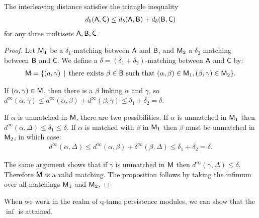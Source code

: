 \begin{proposition}
The interleaving distance satisfies the triangle inequality
\begin{align*}
d_b(\mathsf{A}, \mathsf{C}) \leq d_b(\mathsf{A}, \mathsf{B}) + d_b(\mathsf{B}, \mathsf{C})
\end{align*}
for any three multisets $\mathsf{A}, \mathsf{B}, \mathsf{C}$.
\end{proposition}
\begin{proof}
Let $\mathsf{M}_1$ be a $\delta_1$-matching between $\mathsf{A}$ and $\mathsf{B}$, and $\mathsf{M}_2$ a $\delta_2$ matching between $\mathsf{B}$ and $\mathsf{C}$. We define a $\delta = (\delta_1 + \delta_2)$-matching between $\mathsf{A}$ and $\mathsf{C}$ by:
\begin{align*}
\mathsf{M} = \{ (a, \gamma) \, \mid \, \text{there exists } \beta \in \mathsf{B} \text{ such that } (\alpha, \beta) \in \mathsf{M}_1, (\beta, \gamma) \in \mathsf{M}_2\}.
\end{align*}

If $(\alpha, \gamma) \in \mathsf{M}$, then there is a $\beta$ linking $\alpha$ and $\gamma$, so $d^\infty(\alpha, \gamma) \leq d^\infty(\alpha, \beta) + d^\infty(\beta, \gamma) \leq \delta_1 + \delta_2 = \delta$.

If $\alpha$ is unmatched in $\mathsf{M}$, there are two possibilities. If $\alpha$ is unmatched in $\mathsf{M}_1$ then $d^\infty(\alpha, \Delta) \leq \delta_1 \leq \delta$. If $\alpha$ is matched with $\beta$ in $\mathsf{M}_1$ then $\beta$ must be unmatched in $\mathsf{M}_2$, in which case:
\begin{align*}
d^\infty(\alpha, \Delta) \leq d^\infty(\alpha, \beta) + \delta^\infty(\beta, \Delta) \leq \delta_1 + \delta_2 = \delta.
\end{align*}

The same argument shows that if $\gamma$ is unmatched in $\mathsf{M}$ then $d^\infty(\gamma, \Delta) \leq \delta$. Therefore $\mathsf{M}$ is a valid matching. The proposition follows by taking the infimum over all matchings $\mathsf{M}_1$ and $\mathsf{M}_2$.
\end{proof}

When we work in the realm of q-tame persistence modules, we can show that the $\inf$ is attained. 

